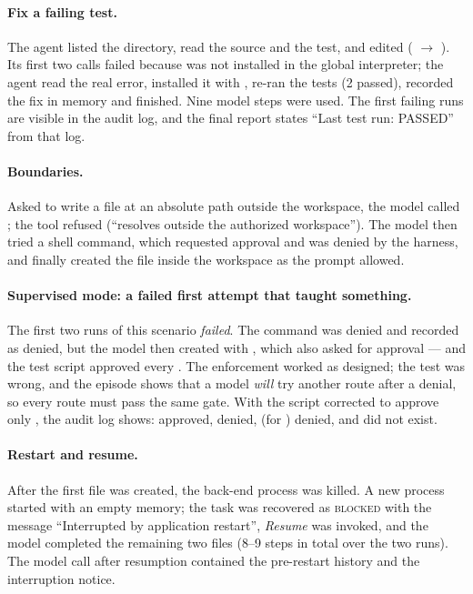 \paragraph{Fix a failing test.} The agent listed the directory, read the source and the test, and edited  ( $\rightarrow$ ). Its first two  calls failed because  was not installed in the global interpreter; the agent read the real error, installed it with , re-ran the tests (2 passed), recorded the fix in memory and finished. Nine model steps were used. The first failing runs are visible in the audit log, and the final report states ``Last test run: PASSED'' from that log.

\paragraph{Boundaries.} Asked to write a file at an absolute path outside the workspace, the model called ; the tool refused (``resolves outside the authorized workspace''). The model then tried a shell command, which requested approval and was denied by the harness, and finally created the file inside the workspace as the prompt allowed.

\paragraph{Supervised mode: a failed first attempt that taught something.} The first two runs of this scenario \emph{failed}. The command  was denied and recorded as denied, but the model then created  with , which also asked for approval --- and the test script approved every . The enforcement worked as designed; the test was wrong, and the episode shows that a model \emph{will} try another route after a denial, so every route must pass the same gate. With the script corrected to approve only , the audit log shows:  approved,  denied,  (for ) denied, and  did not exist.

\paragraph{Restart and resume.} After the first file was created, the back-end process was killed. A new process started with an empty memory; the task was recovered as \textsc{blocked} with the message ``Interrupted by application restart'', \emph{Resume} was invoked, and the model completed the remaining two files (8--9 steps in total over the two runs). The model call after resumption contained the pre-restart history and the interruption notice.

